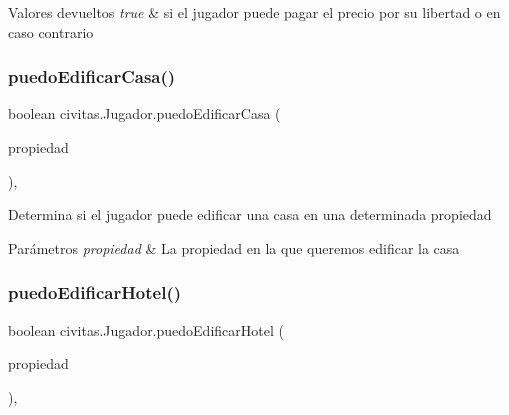 \begin{DoxyRetVals}{Valores devueltos}
{\em true} & si el jugador puede pagar el precio por su libertad o  en caso contrario \\
\hline
\end{DoxyRetVals}
\mbox{\label{classcivitas_1_1Jugador_a471ecc3440579578a91e2eb5cf3a7acc}} 
\subsubsection{\texorpdfstring{puedo\+Edificar\+Casa()}{puedoEdificarCasa()}}
{\footnotesize\ttfamily boolean civitas.\+Jugador.\+puedo\+Edificar\+Casa (\begin{DoxyParamCaption}\item[{\hyperlink{classcivitas_1_1TituloPropiedad}{Titulo\+Propiedad}}]{propiedad }\end{DoxyParamCaption})\hspace{0.3cm}{\ttfamily [inline]}, {\ttfamily [private]}}

Determina si el jugador puede edificar una casa en una determinada propiedad 
\begin{DoxyParams}{Parámetros}
{\em propiedad} & La propiedad en la que queremos edificar la casa \\
\hline
\end{DoxyParams}
\mbox{\label{classcivitas_1_1Jugador_ab5a6f51daa7036633cfba1f68b653228}} 
\subsubsection{\texorpdfstring{puedo\+Edificar\+Hotel()}{puedoEdificarHotel()}}
{\footnotesize\ttfamily boolean civitas.\+Jugador.\+puedo\+Edificar\+Hotel (\begin{DoxyParamCaption}\item[{\hyperlink{classcivitas_1_1TituloPropiedad}{Titulo\+Propiedad}}]{propiedad }\end{DoxyParamCaption})\hspace{0.3cm}{\ttfamily [inline]}, {\ttfamily [private]}}

